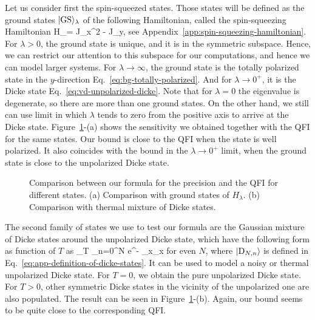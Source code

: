 Let us consider first the spin-squeezed states.
Those states will be defined as the ground states $\vert{\text{GS}}\rangle_\lambda$ of the following Hamiltonian, called the spin-squeezing Hamiltonian
\be
  H_\lambda = J_x^2 - \lambda J_y,
  \label{eq:vd-ss-hamiltonian}
\ee
see Appendix~\ref{app:spin-squeezing-hamiltonian}.
For $\lambda>0$, the ground state is unique, and it is in the symmetric subspace.
Hence, we can restrict our attention to this subspace for our computations, and hence we can model larger systems.
For $\lambda\rightarrow\infty$, the ground state is the totally polarized state in the $y$-direction Eq.~\eqref{eq:bg-totally-polarized}.
And for $\lambda\rightarrow 0^{+}$, it is the Dicke state Eq.~\eqref{eq:vd-unpolarized-dicke}.
Note that for $\lambda=0$ the eigenvalue is degenerate, so there are more than one ground states.
On the other hand, we still can use limit in which $\lambda$ tends to zero from the positive axis to arrive at the Dicke state.
Figure~\ref{fig:vd-comparing-the-bounds}-(a) shows the sensitivity we obtained together with the QFI for the same states.
Our bound is close to the QFI when the state is well polarized.
It also coincides with the bound in the $\lambda\rightarrow 0^{+}$ limit, when the ground state is close to the unpolarized Dicke state.
\begin{figure}[htp]
  \centering
  \caption[Comparing our bound and known QFIs.]{
  Comparison between our formula for the precision and the QFI for different states. (a) Comparison with ground states of $H_\lambda$. (b) Comparison with thermal mixture of Dicke states.}
  \label{fig:vd-comparing-the-bounds}
\end{figure}

The second family of states we use to test our formula are the Gaussian mixture of Dicke states around the unpolarized Dicke state,
which have the following form as function of $T$ as
\be
  \rho_{T} \propto \sum_{n=0}^{N} e^{- } _x_x
\ee
for even $N$, where $\vert{\ensuremath{\textnormal{D}_{N,n}}}\rangle$ is defined in Eq.~\eqref{eq:app-definition-of-dicke-states}.
It can be used to model a noisy or thermal unpolarized Dicke state.
For $T=0$, we obtain the pure unpolarized Dicke state.
For $T>0$, other symmetric Dicke states in the vicinity of the unpolarized one are also populated.
The result can be seen in Figure~\ref{fig:vd-comparing-the-bounds}-(b).
Again, our bound seems to be quite close to the corresponding QFI.

